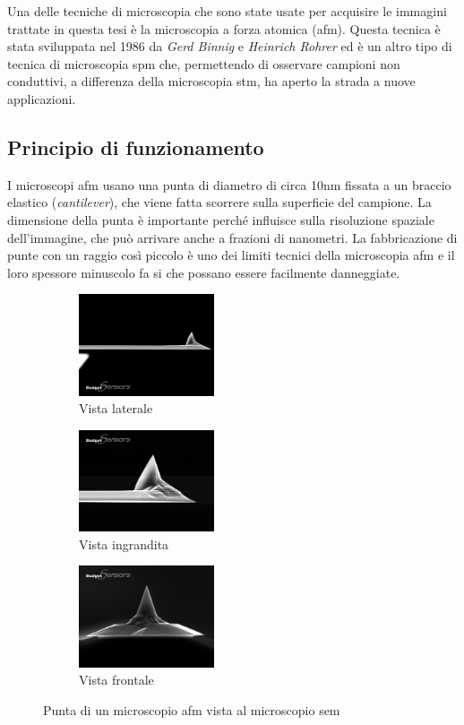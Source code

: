 \documentclass[../main.tex]{subfiles}
\begin{document}
Una delle tecniche di microscopia che sono state usate per acquisire le immagini trattate in questa tesi è la microscopia a forza atomica (\acrshort{afm}). Questa tecnica è stata sviluppata nel 1986 da \textit{Gerd Binnig} e \textit{Heinrich Rohrer} ed è un altro tipo di tecnica di microscopia \acrshort{spm} che, permettendo di osservare campioni non conduttivi, a differenza della microscopia \acrshort{stm}, ha aperto la strada a nuove applicazioni.\cite{binnig_1986}

\subsection{Principio di funzionamento}

I microscopi \acrshort{afm} usano una punta di diametro di circa 10nm fissata a un braccio elastico (\textit{cantilever}), che viene fatta scorrere sulla superficie del campione. La dimensione della punta è importante perché influisce sulla risoluzione spaziale dell'immagine, che può arrivare anche a frazioni di nanometri. La fabbricazione di punte con un raggio così piccolo è uno dei limiti tecnici della microscopia \acrshort{afm} e il loro spessore minuscolo fa si che possano essere facilmente danneggiate.\\

\begin{figure}[H]
	\centering
	\begin{subfigure}{4cm}
		\includegraphics[width=4cm]{images/afm_tip.png}
		\caption{Vista laterale}
	\end{subfigure}
	\hfill
	\begin{subfigure}{4cm}
		\includegraphics[width=4cm]{images/afm_tip_zoom.png}
		\caption{Vista ingrandita}
	\end{subfigure}
	\hfill
	\begin{subfigure}{4cm}
		\includegraphics[width=4cm]{images/afm_tip_front.png}
		\caption{Vista frontale}
	\end{subfigure}
\caption[Punta di un microscopio AFM vista al microscopio SEM]{
	Punta di un microscopio \acrshort{afm} vista al microscopio \acrshort{sem}\ \cite{budgetsensors} }
\label{fig:afm_tip}
\end{figure}
\end{document}
